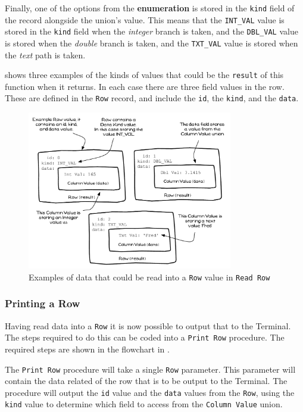 Finally, one of the options from the \textbf{enumeration} is stored in the \texttt{kind} field of the record alongside the union's value. This means that the \texttt{INT\_VAL} value is stored in the \texttt{kind} field when the \emph{integer} branch is taken, and the \texttt{DBL\_VAL} value is stored when the \emph{double} branch is taken, and the \texttt{TXT\_VAL} value is stored when the \emph{text} path is taken.

 shows three examples of the kinds of values that could be the \texttt{result} of this function when it returns. In each case there are three field values in the row. These are defined in the \texttt{Row} record, and include the \texttt{id}, the \texttt{kind}, and the \texttt{data}.

\begin{figure}[htbp]
   \centering
   \includegraphics[width=0.8\textwidth]{./topics/type-decl/diagrams/RowDataRead} 
   \caption{Examples of data that could be read into a \texttt{Row} value in \texttt{Read Row}}
   \label{fig:read-row-data}
\end{figure}

\clearpage
\subsubsection{Printing a Row} %
\label{ssub:printing_a_row}

Having read data into a \texttt{Row} it is now possible to output that to the Terminal. The steps required to do this can be coded into a \texttt{Print Row} procedure. The required steps are shown in the flowchart in .

The \texttt{Print Row} procedure will take a single \texttt{Row} parameter. This parameter will contain the data related of the row that is to be output to the Terminal. The procedure will output the \texttt{id} value and the \texttt{data} values from the \texttt{Row}, using the \texttt{kind} value to determine which field to access from the \texttt{Column Value} union.

